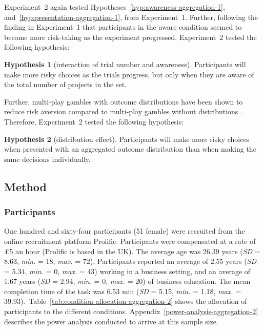 \documentclass[a4paper, nobind]{templates/ociamthesis}
\theoremstyle{definition}
\theoremstyle{definition}
\theoremstyle{definition}
\theoremstyle{definition}
\newtheorem{hypothesis}{Hypothesis}[chapter]
\theoremstyle{remark}
\begin{document}
Experiment~2 again tested Hypotheses~\ref{hyp:awareness-aggregation-1},
and~\ref{hyp:presentation-aggregation-1}, from Experiment~1. Further, following
the finding in Experiment~1 that participants in the aware condition seemed to
become more risk-taking as the experiment progressed, Experiment~2 tested the
following hypothesis:

\begin{hypothesis}[interaction of trial number and awareness]
\protect\hypertarget{hyp:awareness-trials-aggregation-2}{}{\label{hyp:awareness-trials-aggregation-2} \iffalse (interaction of trial number and awareness) \fi{} }Participants will make more risky choices as the trials progress, but only when
they are aware of the total number of projects in the set.
\end{hypothesis}

Further, multi-play gambles with outcome distributions have been shown to reduce
risk aversion compared to multi-play gambles without distributions \autocites[e.g.,][]{redelmeier1992,webb2017}. Therefore, Experiment~2 tested the following
hypothesis:

\begin{hypothesis}[distribution effect]
\protect\hypertarget{hyp:distribution-aggregation-2}{}{\label{hyp:distribution-aggregation-2} \iffalse (distribution effect) \fi{} }Participants will make more risky choices when presented with an aggregated
outcome distribution than when making the same decisions individually.
\end{hypothesis}

\subsection{Method}

\subsubsection{Participants}

One hundred and sixty-four participants (51 female) were recruited from the online recruitment platform Prolific. Participants were compensated at a rate of \pounds 5 an hour (Prolific is based in the UK). The average age was 26.39 years (\emph{SD} = 8.63, \emph{min.} = 18, \emph{max.} = 72). Participants reported an average of 2.55 years (\emph{SD} = 5.34, \emph{min.} = 0, \emph{max.} = 43) working in a business setting, and an average of 1.67 years (\emph{SD} = 2.94, \emph{min.} = 0, \emph{max.} = 20) of business education. The mean completion time of the task was 6.53 min (\emph{SD} = 5.15, \emph{min.} = 1.18, \emph{max.} = 39.93).~Table~\ref{tab:condition-allocation-aggregation-2}
shows the allocation of participants to the different conditions.
Appendix~\ref{power-analysis-aggregation-2} describes the power analysis
conducted to arrive at this sample size.
\end{document}
